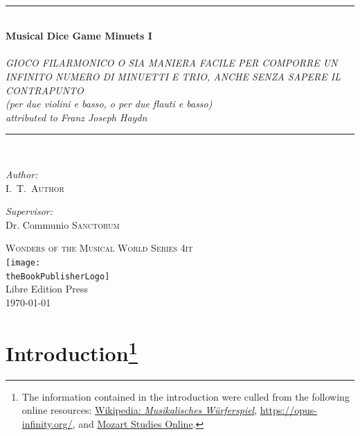 \documentclass[a4paper,x11names,svgnames,10pt]{article}
\title{\textsc{\mdgBookTitle}}
\author{\textsc{\authorFirstMidNameInit \authorLastName}}
\date{\textsc{\dateGenerated}}
\def\authorFirstMidNameInit{I.\ T.\ }
\def\authorLastName{Author}
\def\dateGenerated{\today}
\def\volNumber{I}
\def\mdgBookTitle{Musical Dice Game Minuets \volNumber}
\def\mdgBookSubTitle{\hspace{.10in}{\small ${}$\\ based on}\\ \hspace{.15in}GIOCO FILARMONICO O SIA MANIERA FACILE PER COMPORRE UN INFINITO NUMERO DI MINUETTI E TRIO, ANCHE SENZA SAPERE IL CONTRAPUNTO\\ {\small\hspace{.10in} (per due violini e basso, o per due flauti e basso)}\\ \hspace{.10in}attributed to Franz Joseph Haydn}
\def\theBookSeries{Wonders of the Musical World Series 4it}
\def\theBookPublisher{Libre Edition Press}
\def\theBookPublisherLogo{../images/1ed.png}
\newcommand{\HRule}{\rule{\linewidth}{0.5mm}}
\begin{document}


\newpage
{
${}_{}$\\
\vspace{1.00in}	
\thispagestyle{empty}
\begin{center}
	\HRule \\[0.4cm]
	{\huge \bfseries \mdgBookTitle} \\[0.2cm]
	{\large{\em \mdgBookSubTitle} }\\[0.2cm]
	\HRule \\[1.5cm]
	\begin{minipage}{0.4\textwidth}
		\begin{flushleft} \large
			\emph{Author:}\\
			\authorFirstMidNameInit \textsc{\authorLastName}
		\end{flushleft}
	\end{minipage}
	\begin{minipage}{0.4\textwidth}
		\begin{flushright} \large
			\emph{Supervisor:} \\
			Dr. Communio \textsc{Sanctorum}
		\end{flushright}
	\end{minipage}
	\vfill
	{\textsc{\Large \theBookSeries}}  \\[0.2cm] 
	\texttt{[image: \\theBookPublisherLogo]}\\ 
	{\large \theBookPublisher \\
       \dateGenerated }\\
	\vspace{2.50in}
\end{center}
\newpage


\tableofcontents\label{tabofcon}
\newpage


\baselineskip 14pt

\section[Introduction]{Introduction\footnote{The information contained in the introduction were culled from the following online resources:
	\href{https://en.wikipedia.org/w/index.php?title=Musikalisches\_W\%C3\%BCrfelspiel&oldid=787418377}{Wikipedia: {\em Musikalisches W\"{u}rferspiel}}, %
	\url{https://opus-infinity.org/}, and 
	\href{(http://www.asahi-net.or.jp/\~rb5h-ngc/e/k516f.htm}{Mozart Studies Online}.
	}
}

}
\end{document}
